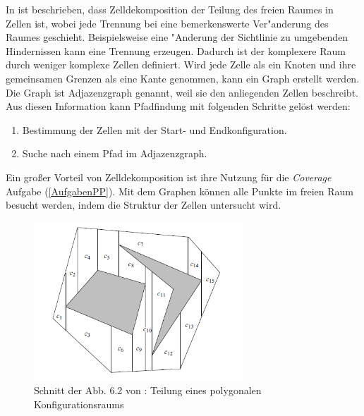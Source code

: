In \cite{Principles:05} ist beschrieben, dass Zelldekomposition der Teilung des freien Raumes in Zellen ist, wobei jede Trennung bei eine bemerkenswerte Ver"anderung des Raumes geschieht. Beispielsweise eine "Anderung der Sichtlinie zu umgebenden Hindernissen kann eine Trennung erzeugen. Dadurch ist der komplexere Raum durch weniger komplexe Zellen definiert. Wird jede Zelle als ein Knoten und ihre gemeinsamen Grenzen als eine Kante genommen, kann ein Graph erstellt werden. Die Graph ist Adjazenzgraph genannt, weil sie den anliegenden Zellen beschreibt. 
Aus diesen Information kann Pfadfindung mit folgenden Schritte gelöst werden: 
\begin{enumerate}
	\item Bestimmung der Zellen mit der Start- und Endkonfiguration. 
	\item Suche nach einem Pfad im Adjazenzgraph.
\end{enumerate}
Ein gro{ß}er Vorteil von Zelldekomposition ist ihre Nutzung für die \textit{Coverage} Aufgabe (\ref{AufgabenPP}). Mit dem Graphen können alle Punkte im freien Raum besucht werden, indem die Struktur der Zellen untersucht wird.

\begin{figure}[H] %
	\centering
	\includegraphics[width=0.7\textwidth]{images/Cell_Dekomposition.png}
	\caption{Schnitt der Abb. 6.2 von \cite{Principles:05}: Teilung eines polygonalen Konfigurationsraums}
	\label{potentialfield02}
\end{figure}

